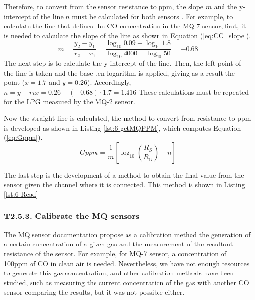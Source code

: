 Therefore, to convert from the sensor resistance to ppm, the slope $m$ and the y-intercept of the line $n$ must be calculated for both sensors \cite{ConfMQX}. For example, to calculate the line that defines the CO concentration in the MQ-7 sensor, first, it is needed to calculate the slope of the line as shown in Equation (\ref{eq:CO_slope}).
\begin{equation} \label{eq:CO_slope}
m=\frac { { y }_{ 2 }-{ y }_{ 1 } }{ { x }_{ 2 }-{ x }_{ 1 } } =\frac { \log _{ 10 }{ 0.09 } -\log _{ 10 }{ 1.8 }  }{ \log _{ 10 }{ 4000 } -\log _{ 10 }{ 50 }  } =-0.68
\end{equation}
The next step is to calculate the y-intercept of the line. Then, the left point of the line is taken and the base ten logarithm is applied, giving as a result the point ($x=1.7$ and $y=0.26$). Accordingly, $n = y - mx =  0.26 - (-0.68)\cdot1.7 = 1.416$ These calculations must be repeated for the LPG measured by the MQ-2 sensor.

Now the straight line is calculated, the method to convert from resistance to ppm is developed as shown in Listing \ref{lst:6-getMQPPM}, which computes Equation (\ref{eq:Gppm}). 
\begin{equation} \label{eq:Gppm}
Gppm=\frac {1}{m} \left[ \log_{10}{ \left( \frac{{R}_{S}}{{R}_{O}} \right)}-n \right] 
\end{equation}



The last step is the development of a method to obtain the final value from the sensor given the channel where it is connected. This method is shown in Listing \ref{lst:6-Read}




\subsubsection{T2.5.3. Calibrate the MQ sensors}
The MQ sensor documentation propose as a calibration method the generation of a certain concentration of a given gas and the measurement of the resultant resistance of the sensor. For example, for MQ-7 sensor, a concentration of 100ppm of CO in clean air is needed. Nevertheless, we have not enough resources to generate this gas concentration, and other calibration methods have been studied, such as measuring the current concentration of the gas with another CO sensor comparing the results, but it was not possible either. 


